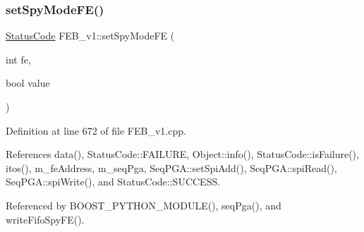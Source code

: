 \subsubsection{\texorpdfstring{set\+Spy\+Mode\+F\+E()}{setSpyModeFE()}}
{\footnotesize\ttfamily \hyperlink{classStatusCode}{Status\+Code} F\+E\+B\+\_\+v1\+::set\+Spy\+Mode\+FE (\begin{DoxyParamCaption}\item[{int}]{fe,  }\item[{bool}]{value }\end{DoxyParamCaption})}



Definition at line 672 of file F\+E\+B\+\_\+v1.\+cpp.



References data(), Status\+Code\+::\+F\+A\+I\+L\+U\+RE, Object\+::info(), Status\+Code\+::is\+Failure(), itos(), m\+\_\+fe\+Address, m\+\_\+seq\+Pga, Seq\+P\+G\+A\+::set\+Spi\+Add(), Seq\+P\+G\+A\+::spi\+Read(), Seq\+P\+G\+A\+::spi\+Write(), and Status\+Code\+::\+S\+U\+C\+C\+E\+SS.



Referenced by B\+O\+O\+S\+T\+\_\+\+P\+Y\+T\+H\+O\+N\+\_\+\+M\+O\+D\+U\+L\+E(), seq\+Pga(), and write\+Fifo\+Spy\+F\+E().


